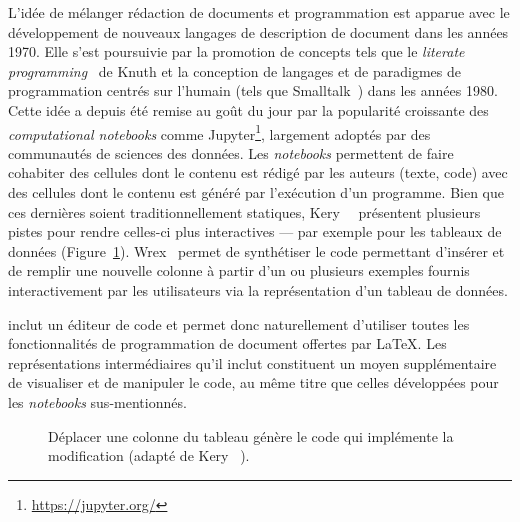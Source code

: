 L'idée de mélanger rédaction de documents et programmation est apparue avec le développement de nouveaux langages de description de document dans les années 1970.
Elle s'est poursuivie par la promotion de concepts tels que le \emph{literate programming}~\cite{knuth1984literate} de Knuth et la conception de langages et de paradigmes de programmation centrés sur l'humain (tels que Smalltalk~\cite{goldberg1983smalltalk80}) dans les années 1980.
Cette idée a depuis été remise au goût du jour par la popularité croissante des \emph{computational notebooks} comme Jupyter\footnote{\url{https://jupyter.org/}}, largement adoptés par des communautés de sciences des données.
Les \emph{notebooks} permettent de faire cohabiter des cellules dont le contenu est rédigé par les auteurs (texte, code) avec des cellules dont le contenu est généré par l'exécution d'un programme.
Bien que ces dernières soient traditionnellement statiques, Kery~\etal{}~\cite{kery2020future} présentent plusieurs pistes pour rendre celles-ci plus interactives --- par exemple pour les tableaux de données ({Figure~\ref{fig:interactive-dataframe-exemple}}).
Wrex~\cite{drosos2020wrex} permet de synthétiser le code permettant d'insérer et de remplir une nouvelle colonne à partir d'un ou plusieurs exemples fournis interactivement par les utilisateurs via la représentation d'un tableau de données.

\iLaTeX{} inclut un éditeur de code et permet donc naturellement d'utiliser toutes les fonctionnalités de programmation de document offertes par \LaTeX{}.
Les représentations intermédiaires qu'il inclut constituent un moyen supplémentaire de
visualiser et de manipuler le code, au même titre que celles développées pour les \emph{notebooks} sus-mentionnés.

\begin{figure}
    \centering
    \caption{Déplacer une colonne du tableau génère le code qui implémente la modification (adapté de Kery \etal~\cite{kery2020future}).}
    \label{fig:interactive-dataframe-exemple}
\end{figure}



